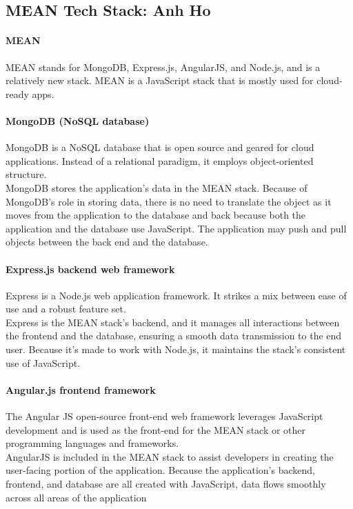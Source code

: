 \documentclass[a4paper, 11pt]{report}
\begin{document}
	\subsection{MEAN Tech Stack: Anh Ho}
	\paragraph{MEAN} MEAN stands for MongoDB, Express.js, AngularJS, and Node.js, and is a relatively new stack. MEAN is a JavaScript stack that is mostly used for cloud-ready apps.

	\paragraph{MongoDB (NoSQL database)} MongoDB is a NoSQL database that is open source and geared for cloud applications. Instead of a relational paradigm, it employs object-oriented structure.
	\\ MongoDB stores the application's data in the MEAN stack. Because of MongoDB’s role in storing data, there is no need to translate the object as it moves from the application to the database and back because both the application and the database use JavaScript. The application may push and pull objects between the back end and the database.

	\paragraph{Express.js backend web framework} Express is a Node.js web application framework. It strikes a mix between ease of use and a robust feature set.
	\\ Express is the MEAN stack's backend, and it manages all interactions between the frontend and the database, ensuring a smooth data transmission to the end user. Because it's made to work with Node.js, it maintains the stack's consistent use of JavaScript.

	\paragraph {Angular.js frontend framework} The Angular JS open-source front-end web framework leverages JavaScript development and is used as the front-end for the MEAN stack or other programming languages and frameworks.
	\\AngularJS is included in the MEAN stack to assist developers in creating the user-facing portion of the application. Because the application's backend, frontend, and database are all created with JavaScript, data flows smoothly across all areas of the application
\end{document}
